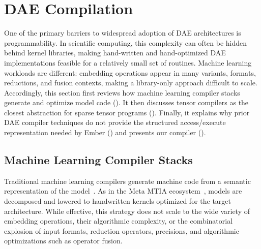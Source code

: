 \section{DAE Compilation} \label{sec:related-work-dae-compilation}

One of the primary barriers to widespread adoption of DAE architectures is programmability. In scientific computing, this complexity can often be hidden behind kernel libraries, making hand-written and hand-optimized DAE implementations feasible for a relatively small set of routines. Machine learning workloads are different: embedding operations appear in many variants, formats, reductions, and fusion contexts, making a library-only approach difficult to scale.
Accordingly, this section first reviews how machine learning compiler stacks generate and optimize model code (). It then discusses tensor compilers as the closest abstraction for sparse tensor programs (). Finally, it explains why prior DAE compiler techniques do not provide the structured access/execute representation needed by Ember () and presents our compiler ().

\subsection{Machine Learning Compiler Stacks} \label{sec:related-work-ml-compiler-stacks}
Traditional machine learning compilers generate machine code from a semantic representation of the model~\cite{abadi2015tensorflow,paszke2019neurips,wang2019arxiv,bradbury2018jax,fey2019iclrworkshop,smelyanskiy2018arxiv,iree2019github}. As in the Meta MTIA ecosystem~\cite{firoozshahian2023isca}, models are decomposed and lowered to handwritten kernels optimized for the target architecture. While effective, this strategy does not scale to the wide variety of embedding operations, their algorithmic complexity, or the combinatorial explosion of input formats, reduction operators, precisions, and algorithmic optimizations such as operator fusion.

